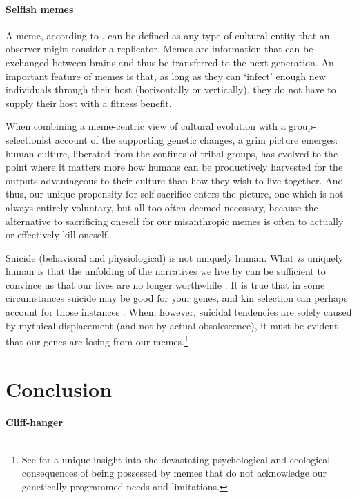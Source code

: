 \documentclass{article}
\begin{document}
\paragraph{Selfish memes}

A meme, according to \citet{dawkins1976}, can be defined as any type of
cultural entity that an observer might consider a replicator.  Memes are
information that can be exchanged between brains and thus be transferred to the
next generation. An important feature of memes is that, as long as they can
‘infect’ enough new individuals through their host (horizontally or
vertically), they do not have to supply their host with a fitness benefit.

When combining a meme-centric view of cultural evolution with a
group-selectionist account of the supporting genetic changes, a grim picture
emerges: human culture, liberated from the confines of tribal groups, has
evolved to the point where it matters more how humans can be productively
harvested for the outputs advantageous to their culture than how they wish to
live together. And thus, our unique propensity for self-sacrifice enters the
picture, one which is not always entirely voluntary, but all too often deemed
necessary, because the alternative to sacrificing oneself for our misanthropic
memes is often to actually or effectively kill oneself.

Suicide (behavioral and physiological) is not uniquely human. What \emph{is}
uniquely human is that the unfolding of the narratives we live by can be
sufficient to convince us that our lives are no longer worthwhile
\citep{baumeister1990}. It is true that in some circumstances suicide may be
good for your genes, and kin selection can perhaps account for those instances
\citep{bering2010}. When, however, suicidal tendencies are solely caused by
mythical displacement (and not by actual obsolescence), it must be evident that
our genes are losing from our memes.\footnote{See \citet{quinn1992} for a unique
insight into the devastating psychological and ecological consequences of being
possessed by memes that do not acknowledge our genetically programmed needs and
limitations.}

\section{Conclusion}

\paragraph{Cliff-hanger}
\end{document}
